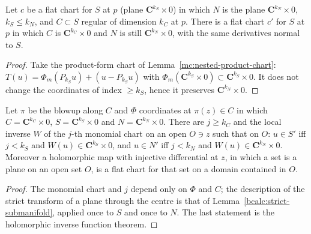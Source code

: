 \begin{lemma}
\label{mc:nested-pair-chart}
\leanok
Let \(c\) be a flat chart for \(S\) at \(p\) (plane \(\mathbf C^{k_S}\times0\)) in which \(N\) is the plane \(\mathbf C^{k_N}\times0\), \(k_S\le k_N\), and \(C\subset S\) regular of
dimension \(k_C\) at \(p\). There is a flat chart \(c'\) for \(S\) at \(p\) in which \(C\) is \(\mathbf C^{k_C}\times0\) and \(N\) is still \(\mathbf C^{k_N}\times0\), with the same
derivatives normal to \(S\).
\end{lemma}
\begin{proof}
\leanok
Take the product-form chart of Lemma~\ref{mc:nested-product-chart}: \(T(u)=\Phi_m(P_{k_S}u)+(u-P_{k_S}u)\) with \(\Phi_m(\mathbf C^{k_S}\times0)\subset\mathbf C^{k_S}\times0\).
It does not change the coordinates of index \(\ge k_S\), hence it preserves \(\mathbf C^{k_N}\times0\).
\end{proof}

\begin{lemma}
\label{mc:strict-pair-monomial}
\leanok
Let \(\pi\) be the blowup along \(C\) and \(\Phi\) coordinates at \(\pi(z)\in C\) in which \(C=\mathbf C^{k_C}\times0\), \(S=\mathbf C^{k_S}\times0\) and \(N=\mathbf C^{k_N}\times0\).
There are \(j\ge k_C\) and the local inverse \(W\) of the \(j\)-th monomial chart on an open \(O\ni z\) such that on \(O\): \(u\in S'\) iff \(j<k_S\) and
\(W(u)\in\mathbf C^{k_S}\times0\), and \(u\in N'\) iff \(j<k_N\) and \(W(u)\in\mathbf C^{k_N}\times0\). Moreover a holomorphic map with injective differential at \(z\), in
which a set is a plane on an open set \(O\), is a flat chart for that set on a domain contained in \(O\).
\end{lemma}
\begin{proof}
\leanok
The monomial chart and \(j\) depend only on \(\Phi\) and \(C\); the description of the strict transform of a plane through the centre is that of
Lemma~\ref{bcalc:strict-submanifold}, applied once to \(S\) and once to \(N\). The last statement is the holomorphic inverse function theorem.
\end{proof}


